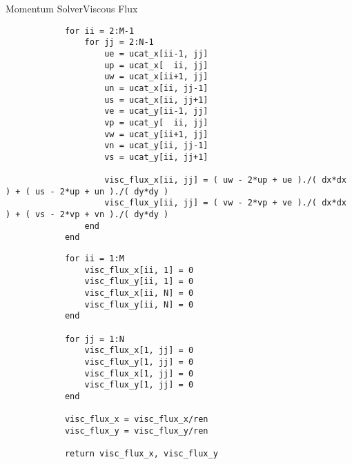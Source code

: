 \documentclass[\string~/GitHub/sthlmNordBeamerTheme/sthlmNordLightDemo.tex]{subfiles}
\begin{document}
\begin{frame}{Momentum Solver}{Viscous Flux}

    \begin{center}
        \begin{verbatim}
            for ii = 2:M-1
                for jj = 2:N-1
                    ue = ucat_x[ii-1, jj]
                    up = ucat_x[  ii, jj]
                    uw = ucat_x[ii+1, jj]
                    un = ucat_x[ii, jj-1]
                    us = ucat_x[ii, jj+1]
                    ve = ucat_y[ii-1, jj]
                    vp = ucat_y[  ii, jj]
                    vw = ucat_y[ii+1, jj]
                    vn = ucat_y[ii, jj-1]
                    vs = ucat_y[ii, jj+1]
                    
                    visc_flux_x[ii, jj] = ( uw - 2*up + ue )./( dx*dx ) + ( us - 2*up + un )./( dy*dy )
                    visc_flux_y[ii, jj] = ( vw - 2*vp + ve )./( dx*dx ) + ( vs - 2*vp + vn )./( dy*dy )
                end
            end
        \end{verbatim}
    \end{center}

    \framebreak

    \begin{center}
        \begin{verbatim}
            for ii = 1:M
                visc_flux_x[ii, 1] = 0
                visc_flux_y[ii, 1] = 0
                visc_flux_x[ii, N] = 0
                visc_flux_y[ii, N] = 0
            end

            for jj = 1:N
                visc_flux_x[1, jj] = 0
                visc_flux_y[1, jj] = 0
                visc_flux_x[1, jj] = 0
                visc_flux_y[1, jj] = 0
            end

            visc_flux_x = visc_flux_x/ren
            visc_flux_y = visc_flux_y/ren

            return visc_flux_x, visc_flux_y
        \end{verbatim}
    \end{center}
    
\end{frame}
\end{document}
